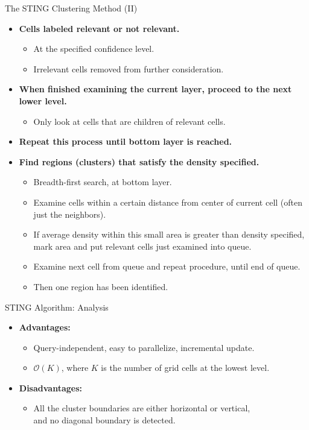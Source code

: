 \begin{frame}{The STING Clustering Method (II)}
	\begin{itemize}
		\item \textbf{Cells labeled relevant or not relevant.}
		\begin{itemize}
			\item At the specified confidence level.
			\item Irrelevant cells removed from further consideration.
		\end{itemize}
		\item \textbf{When finished examining the current layer, proceed to the 
		next lower level.}
		\begin{itemize}
			\item Only look at cells that are children of relevant cells.
		\end{itemize}
		\item \textbf{Repeat this process until bottom layer is reached.}
		\item \textbf{Find regions (clusters) that satisfy the 
		{\color{airforceblue}density} specified.}
		\begin{itemize}
			\item Breadth-first search, at bottom layer.
			\item Examine cells within a certain distance from center of 
			current cell (often just the neighbors).
			\item If average density within this small area is greater than 
			density specified, mark area and put relevant cells just examined 
			into queue.
			\item Examine next cell from queue and repeat procedure, until end 
			of queue.
			\item Then one region has been identified.
		\end{itemize}
	\end{itemize}
\end{frame}

\begin{frame}{STING Algorithm: Analysis}
	\begin{itemize}
		\item \textbf{Advantages:}
		\begin{itemize}
			\item Query-independent, easy to parallelize, incremental update.
			\item $\mathcal{O}(K)$, where $K$ is the number of grid cells at 
			the lowest level.
		\end{itemize}
		\item \textbf{Disadvantages:}
		\begin{itemize}
			\item All the cluster boundaries are either horizontal or vertical, 
			\\
			and no diagonal boundary is detected.
		\end{itemize}
	\end{itemize}
\end{frame}

